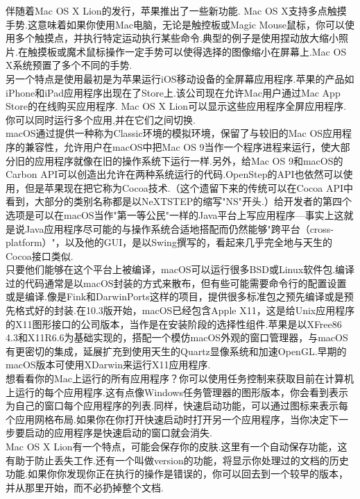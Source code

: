 \documentclass[a4paper,12pt,notitlepage]{article}
\begin{document}
	伴随着Mac OS X Lion的发行，苹果推出了一些新功能. Mac OS X支持多点触摸手势.这意味着如果你使用Mac电脑，无论是触控板或Magic Mouse鼠标，你可以使用多个触摸点，并执行特定运动执行某些命令.典型的例子是使用捏动放大缩小照片.在触摸板或魔术鼠标操作一定手势可以使得选择的图像缩小在屏幕上.Mac OS X系统预置了多个不同的手势. \\
	
	另一个特点是使用最初是为苹果运行iOS移动设备的全屏幕应用程序.苹果的产品如iPhone和iPad应用程序出现在了Store上.该公司现在允许Mac用户通过Mac App Store的在线购买应用程序. Mac OS X Lion可以显示这些应用程序全屏应用程序.你可以同时运行多个应用,并在它们之间切换. \\
	
	macOS通过提供一种称为Classic环境的模拟环境，保留了与较旧的Mac OS应用程序的兼容性，允许用户在macOS中把Mac OS 9当作一个程序进程来运行，使大部分旧的应用程序就像在旧的操作系统下运行一样.另外，给Mac OS 9和macOS的Carbon API可以创造出允许在两种系统运行的代码.OpenStep的API也依然可以使用，但是苹果现在把它称为Cocoa技术.（这个遗留下来的传统可以在Cocoa API中看到，大部分的类别名称都是以NeXTSTEP的缩写"NS"开头.）给开发者的第四个选项是可以在macOS当作"第一等公民"一样的Java平台上写应用程序—事实上这就是说Java应用程序尽可能的与操作系统合适地搭配而仍然能够"跨平台（cross-platform）"，以及他的GUI，是以Swing撰写的，看起来几乎完全地与天生的Cocoa接口类似. \\
	
	只要他们能够在这个平台上被编译，macOS可以运行很多BSD或Linux软件包.编译过的代码通常是以macOS封装的方式来散布，但有些可能需要命令行的配置设置或是编译.像是Fink和DarwinPorts这样的项目，提供很多标准包之预先编译或是预先格式好的封装.在10.3版开始，macOS已经包含Apple X11，这是给Unix应用程序的X11图形接口的公司版本，当作是在安装阶段的选择性组件.苹果是以XFree86 4.3和X11R6.6为基础实现的，搭配一个模仿macOS外观的窗口管理器，与macOS有更密切的集成，延展扩充到使用天生的Quartz显像系统和加速OpenGL.早期的macOS版本可使用XDarwin来运行X11应用程序. \\
	
	想看看你的Mac上运行的所有应用程序？你可以使用任务控制来获取目前在计算机上运行的每个应用程序.这有点像Windows任务管理器的图形版本，你会看到表示为自己的窗口每个应用程序的列表.同样，快速启动功能，可以通过图标来表示每个应用网格布局.如果你在你打开快速启动时打开另一个应用程序，当你决定下一步要启动的应用程序是快速启动的窗口就会消失. \\
	
	Mac OS X Lion有一个特点，可能会保存你的皮肤.这里有一个自动保存功能，这有助于防止丢失工作.还有一个叫做version的功能，将显示你处理过的文档的历史功能.如果你你发现你正在执行的操作是错误的，你可以回去到一个较早的版本，并从那里开始，而不必扔掉整个文档. \\
	
\end{document}
